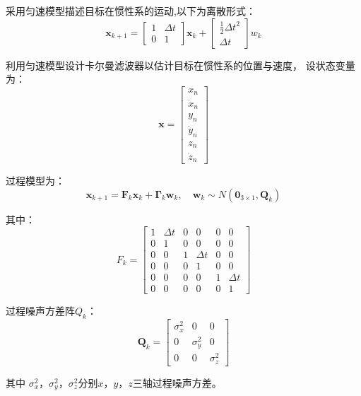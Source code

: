\par
采用匀速模型描述目标在惯性系的运动,以下为离散形式：
\begin{equation} \boldsymbol x_{k+1} =\left[\begin{array}{cc} {1} & \Delta t  \\ 0 & {1}  \end{array}\right]\boldsymbol x_{k} + \left[\begin{array}{c} {\frac{1}{2}\Delta t^2} \\ {\Delta t}  \end{array}\right]w_k \end{equation}



利用匀速模型设计卡尔曼滤波器以估计目标在惯性系的位置与速度，
设状态变量为：\begin{equation} \boldsymbol x =\left[\begin{array}{c} x_n\\ \dot x_n\\ y_n\\ \dot y_n\\ z_n\\ \dot z_n \end{array}\right] \end{equation}
\par
过程模型为：\begin{equation} \boldsymbol  x_{k+1} = \boldsymbol F_k\boldsymbol  x_k + \boldsymbol{\Gamma}_{k}\boldsymbol {w}_{k}, \quad \boldsymbol {w}_{k} \sim N\left(\boldsymbol 0_{3 \times 1}, \boldsymbol Q_k \right) \end{equation}

其中： 
\begin{equation} F_k =\left[\begin{array}{cccccc} 1 &  \Delta t & 0 &0&0&0\\ 0 &  1 & 0 &0&0&0\\ 0 & 0 & 1&  \Delta t & 0 &0\\ 0&0&   0&1 &0 &0\\ 0 &0& 0 &0& 1 &\Delta t \\ 0 &0& 0 & 0 &0 &1 \end{array}\right] \end{equation}

过程噪声方差阵$Q_k$：
\begin{equation} \boldsymbol Q_k =\left[\begin{array}{ccc} \sigma_x^2 &  0 & 0 \\ 0 &  \sigma_y^2 & 0 \\ 0 & 0 & \sigma_z^2 \end{array}\right] \end{equation}
\par
其中 $\sigma_x^2$，$\sigma_y ^2$，$\sigma_z^2$分别$x$，$y$，$z$三轴过程噪声方差。
\par


